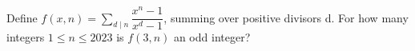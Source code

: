 Define $f(x,n)=\sum_{d\mid n}\dfrac{x^n-1}{x^d-1}$, summing over positive divisors d. For how many integers $1\le n\le 2023$ is $f(3,n)$ an odd integer?
